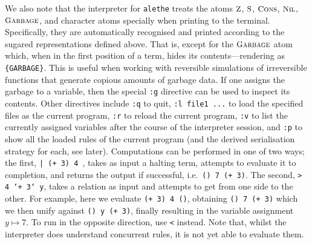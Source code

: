 \documentclass[a4paper]{scrartcl}
\def\atom#1{\ensuremath{\textsc{\small{#1}}}}
\def\Z{\atom{Z}}\def\S{\atom{S}}
\def\Cons{\atom{Cons}}\def\Nil{\atom{Nil}}
\begin{document}
\def\midtilde{\raisebox{-0.23em}{\textasciitilde}}
We also note that the interpreter for \texttt{alethe} treats the atoms \Z, \S, \Cons, \Nil, \atom{Garbage}, and character atoms specially when printing to the terminal. Specifically, they are automatically recognised and printed according to the sugared representations defined above. That is, except for the \atom{Garbage} atom which, when in the first position of a term, hides its contents---rendering as \texttt{\{\midtilde GARBAGE\midtilde\}}. This is useful when working with reversible simulations of irreversible functions that generate copious amounts of garbage data. If one assigns the garbage to a variable, then the special \texttt{:g} directive can be used to inspect its contents. Other directives include \texttt{:q} to quit, \texttt{:l file1 ...} to load the specified files as the current program, \texttt{:r} to reload the current program, \texttt{:v} to list the currently assigned variables after the course of the interpreter session, and \texttt{:p} to show all the loaded rules of the current program (and the derived serialisation strategy for each, see later). Computations can be performed in one of two ways; the first, \texttt{| (+ 3) 4 \raisebox{-0.3em}{-}}, takes as input a halting term, attempts to evaluate it to completion, and returns the output if successful, i.e.\ \texttt{() 7 (+ 3)}. The second, \texttt{> 4 `+ 3` y}, takes a relation as input and attempts to get from one side to the other. For example, here we evaluate \texttt{(+ 3) 4 ()}, obtaining \texttt{() 7 (+ 3)} which we then unify against \texttt{() y (+ 3)}, finally resulting in the variable assignment $y\mapsto7$. To run in the opposite direction, use \texttt{<} instead. Note that, whilst the interpreter does understand concurrent rules, it is not yet able to evaluate them.

\printbibliography
\end{document}
